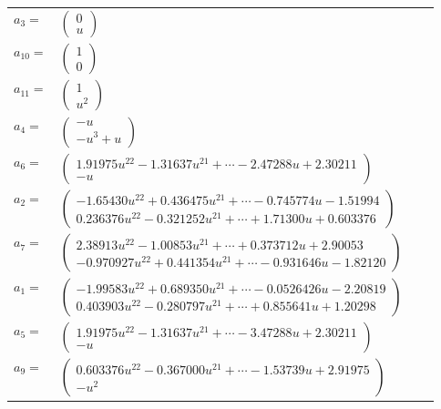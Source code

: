 \documentclass[1p]{elsarticle_modified}
\theoremstyle{definition}
\begin{document}
\begin{tabular}{m{7pt} m{180pt} m{7pt} m{180pt} }
\flushright $a_{3}=$&$\begin{pmatrix}0\\u\end{pmatrix}$ \\
\flushright $a_{10}=$&$\begin{pmatrix}1\\0\end{pmatrix}$ \\
\flushright $a_{11}=$&$\begin{pmatrix}1\\u^2\end{pmatrix}$ \\
\flushright $a_{4}=$&$\begin{pmatrix}- u\\- u^3+u\end{pmatrix}$ \\
\flushright $a_{6}=$&$\begin{pmatrix}1.91975 u^{22}-1.31637 u^{21}+\cdots-2.47288 u+2.30211\\- u\end{pmatrix}$ \\
\flushright $a_{2}=$&$\begin{pmatrix}-1.65430 u^{22}+0.436475 u^{21}+\cdots-0.745774 u-1.51994\\0.236376 u^{22}-0.321252 u^{21}+\cdots+1.71300 u+0.603376\end{pmatrix}$ \\
\flushright $a_{7}=$&$\begin{pmatrix}2.38913 u^{22}-1.00853 u^{21}+\cdots+0.373712 u+2.90053\\-0.970927 u^{22}+0.441354 u^{21}+\cdots-0.931646 u-1.82120\end{pmatrix}$ \\
\flushright $a_{1}=$&$\begin{pmatrix}-1.99583 u^{22}+0.689350 u^{21}+\cdots-0.0526426 u-2.20819\\0.403903 u^{22}-0.280797 u^{21}+\cdots+0.855641 u+1.20298\end{pmatrix}$ \\
\flushright $a_{5}=$&$\begin{pmatrix}1.91975 u^{22}-1.31637 u^{21}+\cdots-3.47288 u+2.30211\\- u\end{pmatrix}$ \\
\flushright $a_{9}=$&$\begin{pmatrix}0.603376 u^{22}-0.367000 u^{21}+\cdots-1.53739 u+2.91975\\- u^2\end{pmatrix}$ \\

\end{tabular}
\end{document}
